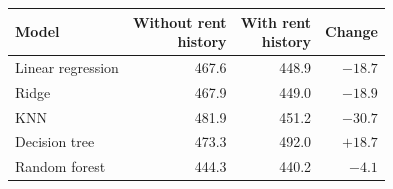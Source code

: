 \begin{tabular}{lrrr}
\hline
\textbf{Model} & \shortstack{Without rent\\history} & \shortstack{With rent\\history} & Change \\
\hline
Linear regression & 467.6 & 448.9 & $-18.7$ \\
Ridge & 467.9 & 449.0 & $-18.9$ \\
KNN & 481.9 & 451.2 & $-30.7$ \\
Decision tree & 473.3 & 492.0 & $+18.7$ \\
Random forest & 444.3 & 440.2 & $-4.1$ \\
\hline
\end{tabular}
